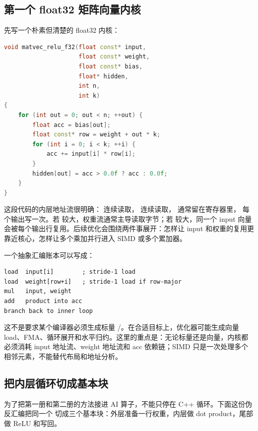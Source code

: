 \subsection{第一个 float32 矩阵向量内核}

先写一个朴素但清楚的 float32 内核：

\begin{lstlisting}[language=C++,caption={float32 reference 风格矩阵向量乘}]
void matvec_relu_f32(float const* input,
                     float const* weight,
                     float const* bias,
                     float* hidden,
                     int n,
                     int k)
{
    for (int out = 0; out < n; ++out) {
        float acc = bias[out];
        float const* row = weight + out * k;
        for (int i = 0; i < k; ++i) {
            acc += input[i] * row[i];
        }
        hidden[out] = acc > 0.0f ? acc : 0.0f;
    }
}
\end{lstlisting}

这段代码的内层地址流很明确： 连续读取， 连续读取， 通常留在寄存器里， 每个输出写一次。若  较大，权重流通常主导读取字节；若  较大，同一个 input 向量会被每个输出行复用。后续优化会围绕两件事展开：怎样让 input 和权重的复用更靠近核心，怎样让多个乘加并行进入 SIMD 或多个累加器。

一个抽象汇编账本可以写成：

\begin{lstlisting}[numbers=none,caption={float32 内层循环的典型机器形态}]
load  input[i]        ; stride-1 load
load  weight[row+i]   ; stride-1 load if row-major
mul   input, weight
add   product into acc
branch back to inner loop
\end{lstlisting}

这不是要求某个编译器必须生成标量 /。在合适目标上，优化器可能生成向量 load、FMA、循环展开和水平归约。这里的重点是：无论标量还是向量，内核都必须消耗 input 地址流、weight 地址流和 acc 依赖链；SIMD 只是一次处理多个相邻元素，不能替代布局和地址分析。

\subsection{把内层循环切成基本块}

为了把第一册和第二册的方法接进 AI 算子，不能只停在 C++ 循环。下面这份伪反汇编把同一个  切成三个基本块：外层准备一行权重，内层做 dot product，尾部做 ReLU 和写回。

